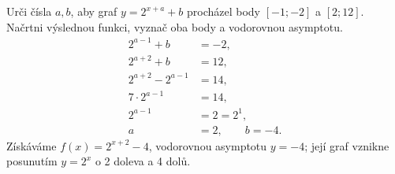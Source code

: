 \documentclass[11pt,a4paper]{article}
\begin{document}
\begin{prikladReseniBox}[title={Příklad 5}]
Urči čísla $a,b$, aby graf $y=2^{x+a}+b$ procházel body $[-1;-2]$ a $[2;12]$. Načrtni výslednou funkci, vyznač oba body a vodorovnou asymptotu.
\tcblower
\[
\begin{aligned}
2^{a-1}+b&=-2,\\
2^{a+2}+b&=12,\\
2^{a+2}-2^{a-1}&=14,\\
7\cdot2^{a-1}&=14,\\
2^{a-1}&=2=2^1,\\
a&=2,\qquad b=-4.
\end{aligned}
\]
Získáváme $f(x)=2^{x+2}-4$, vodorovnou asymptotu $y=-4$; její graf vznikne posunutím $y=2^x$ o 2 doleva a 4 dolů.
\end{prikladReseniBox}
\end{document}
